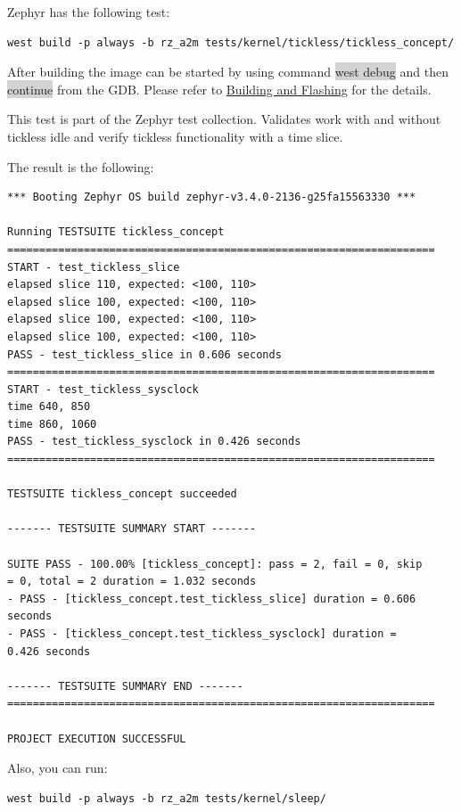 \documentclass[11pt,a4paper,oneside]{article}
\begin{document}
Zephyr has the following test:

\begin{lstlisting}
west build -p always -b rz_a2m tests/kernel/tickless/tickless_concept/
\end{lstlisting}

After building the image can be started by using command \colorbox{lightgray}{west debug}
and then \colorbox{lightgray}{continue} from the GDB. Please refer to
\hyperref[building-and-flashing]{Building and Flashing} for the
details.

This test is part of the Zephyr test collection. Validates work with and
without tickless idle and verify tickless functionality with a time
slice.

The result is the following:

\begin{lstlisting}
*** Booting Zephyr OS build zephyr-v3.4.0-2136-g25fa15563330 ***

Running TESTSUITE tickless_concept
===================================================================
START - test_tickless_slice
elapsed slice 110, expected: <100, 110>
elapsed slice 100, expected: <100, 110>
elapsed slice 100, expected: <100, 110>
elapsed slice 100, expected: <100, 110>
PASS - test_tickless_slice in 0.606 seconds
===================================================================
START - test_tickless_sysclock
time 640, 850
time 860, 1060
PASS - test_tickless_sysclock in 0.426 seconds
===================================================================

TESTSUITE tickless_concept succeeded

------- TESTSUITE SUMMARY START -------

SUITE PASS - 100.00% [tickless_concept]: pass = 2, fail = 0, skip
= 0, total = 2 duration = 1.032 seconds
- PASS - [tickless_concept.test_tickless_slice] duration = 0.606
seconds
- PASS - [tickless_concept.test_tickless_sysclock] duration =
0.426 seconds

------- TESTSUITE SUMMARY END -------
===================================================================

PROJECT EXECUTION SUCCESSFUL
\end{lstlisting}

Also, you can run:

\begin{lstlisting}
west build -p always -b rz_a2m tests/kernel/sleep/
\end{lstlisting}
\end{document}
